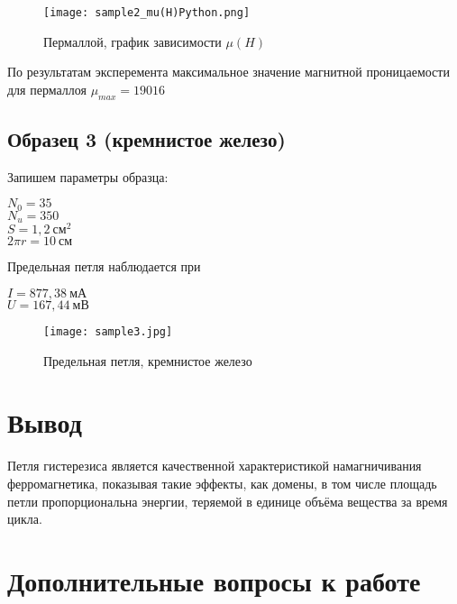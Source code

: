\begin{figure}
	\centering
	\texttt{[image: sample2\_mu(H)Python.png]}
	\caption{Пермаллой, график зависимости $\mu(H)$}
	\label{sample2_muH}
\end{figure}

\newpage



По результатам эксперемента максимальное значение магнитной проницаемости
для пермаллоя $\mu_{max} = 19016$

\begin{center}
\end{center}

\subsection{Образец 3 (кремнистое железо)}

Запишем параметры образца:

\begin{center}
	$N_0 = 35$                   \\
	$N_u = 350$                  \\
	$S = 1,2 ~ \text{см}^2$      \\
	$2 \pi r = 10 ~ \text{см}$
\end{center}

Предельная петля наблюдается при 

\begin{center}
	$I = 877,38 ~ \text{мА}$ \\
	$U = 167,44 ~ \text{мВ}$
\end{center}

\begin{figure}
	\centering
	\texttt{[image: sample3.jpg]}
	\caption{Предельная петля, кремнистое железо}
	\label{sample3_pic}	
\end{figure}

\section{Вывод}

Петля гистерезиса является качественной характеристикой намагничивания ферромагнетика, 
показывая такие эффекты, как домены, в том числе площадь петли пропорциональна энергии, 
теряемой в единице объёма вещества за время цикла.

\section{Дополнительные вопросы к работе}

